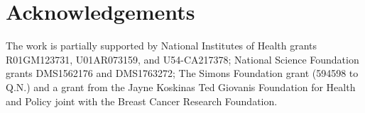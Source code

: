 \documentclass[11pt]{article}
\begin{document}
\section*{Acknowledgements}
The work is partially supported by National Institutes of Health grants R01GM123731, U01AR073159, and U54-CA217378; National Science Foundation grants DMS1562176 and DMS1763272; The Simons Foundation grant (594598 to Q.N.) and a grant from the Jayne Koskinas Ted Giovanis Foundation for Health and Policy joint with the Breast Cancer Research Foundation.




\end{document}
